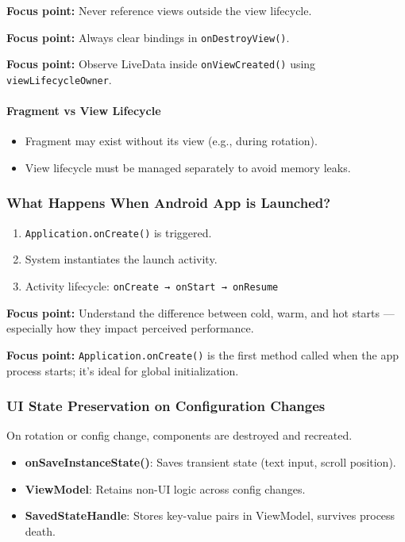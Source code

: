 \documentclass[a4paper,12pt]{article}
\begin{document}
\textbf{Focus point:} Never reference views outside the view lifecycle.

\textbf{Focus point:} Always clear bindings in \texttt{onDestroyView()}.

\textbf{Focus point:} Observe LiveData inside \texttt{onViewCreated()} using \texttt{viewLifecycleOwner}.

\paragraph{Fragment vs View Lifecycle}

\begin{itemize}
  \item Fragment may exist without its view (e.g., during rotation).
  \item View lifecycle must be managed separately to avoid memory leaks.
\end{itemize}

\subsubsection{What Happens When Android App is Launched?}

\begin{enumerate}
  \item \texttt{Application.onCreate()} is triggered.
  \item System instantiates the launch activity.
  \item Activity lifecycle: \texttt{onCreate → onStart → onResume}
\end{enumerate}

\textbf{Focus point:} Understand the difference between cold, warm, and hot starts — especially how they impact perceived performance.

\textbf{Focus point:} \texttt{Application.onCreate()} is the first method called when the app process starts; it's ideal for global initialization.

\subsubsection{UI State Preservation on Configuration Changes}

On rotation or config change, components are destroyed and recreated.

\begin{itemize}
  \item \textbf{onSaveInstanceState()}: Saves transient state (text input, scroll position).
  \item \textbf{ViewModel}: Retains non-UI logic across config changes.
  \item \textbf{SavedStateHandle}: Stores key-value pairs in ViewModel, survives process death.
\end{itemize}
\end{document}
